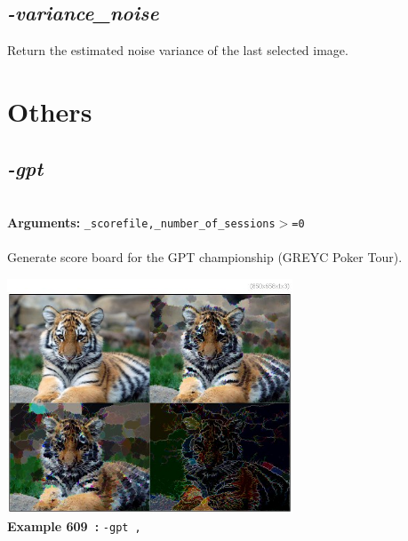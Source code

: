 \documentclass[a4paper,11pt,twoside]{book}
\begin{document}
\subsection{\emph{-variance\_noise} }\vspace*{-0.5em}
Return the estimated noise variance of the last selected image.

\section{Others}


\subsection{\emph{-gpt} }\vspace*{-0.5em}
~\\\textbf{Arguments: } 
{\small \texttt{\_scorefile,\_number\_of\_sessions$>$=0}}\\~\\
Generate score board for the GPT championship (GREYC Poker Tour).
\begin{center}\includegraphics[keepaspectratio=true,height=7cm,width=\textwidth]{img/gmic_def609.jpg}\\
{\footnotesize \textbf{Example 609~:} \texttt{-gpt ,}}
\end{center}
\end{document}
